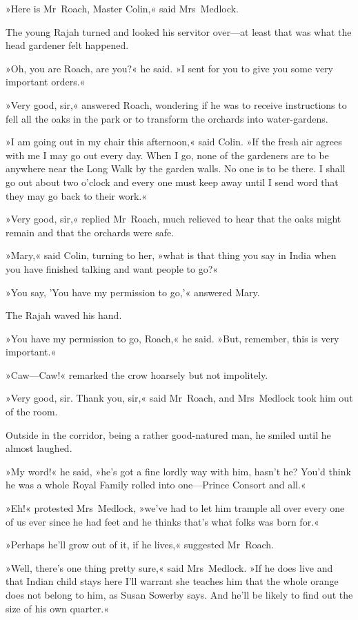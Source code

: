 »Here is Mr~Roach, Master Colin,« said Mrs~Medlock.

The young Rajah turned and looked his servitor over—at least that was what the head gardener felt happened.

»Oh, you are Roach, are you?« he said. »I sent for you to give you some very important orders.«

»Very good, sir,« answered Roach, wondering if he was to receive instructions to fell all the oaks in the park or to transform the orchards into water-gardens.

»I am going out in my chair this afternoon,« said Colin. »If the fresh air agrees with me I may go out every day. When I go, none of the gardeners are to be anywhere near the Long Walk by the garden walls. No one is to be there. I shall go out about two o'clock and every one must keep away until I send word that they may go back to their work.«

»Very good, sir,« replied Mr~Roach, much relieved to hear that the oaks might remain and that the orchards were safe.

»Mary,« said Colin, turning to her, »what is that thing you say in India when you have finished talking and want people to go?«

»You say, 'You have my permission to go,'« answered Mary.

The Rajah waved his hand.

»You have my permission to go, Roach,« he said. »But, remember, this is very important.«

»Caw—Caw!« remarked the crow hoarsely but not impolitely.

»Very good, sir. Thank you, sir,« said Mr~Roach, and Mrs~Medlock took him out of the room.

Outside in the corridor, being a rather good-natured man, he smiled until he almost laughed.

»My word!« he said, »he's got a fine lordly way with him, hasn't he? You'd think he was a whole Royal Family rolled into one—Prince Consort and all.«

»Eh!« protested Mrs~Medlock, »we've had to let him trample all over every one of us ever since he had feet and he thinks that's what folks was born for.«

»Perhaps he'll grow out of it, if he lives,« suggested Mr~Roach.

»Well, there's one thing pretty sure,« said Mrs~Medlock. »If he does live and that Indian child stays here I'll warrant she teaches him that the whole orange does not belong to him, as Susan Sowerby says. And he'll be likely to find out the size of his own quarter.«


